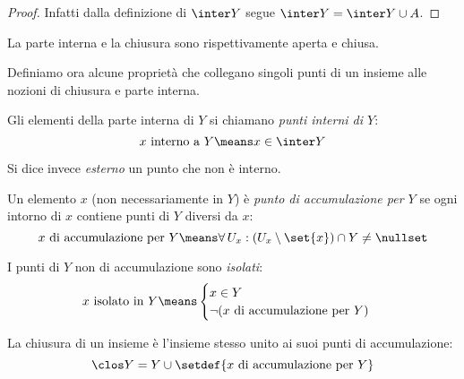 \begin{proof}
	Infatti dalla definizione di $\inter Y$ segue $\inter Y=\inter Y\cup A$.
\end{proof}

\begin{oss}
	La parte interna e la chiusura sono rispettivamente aperta e chiusa.
\end{oss}

Definiamo ora alcune proprietà che collegano singoli punti di un insieme alle nozioni di chiusura e parte interna.

\begin{defn}
	Gli elementi della parte interna di $Y$ si chiamano \emph{punti interni di $Y$}:
	\[x\text{ interno a }Y\means x\in\inter Y\]
\end{defn}

Si dice invece \emph{esterno} un punto che non è interno.


\begin{defn}
	Un elemento $x$ (non necessariamente in $Y$) è \emph{punto di accumulazione per $Y$} se ogni intorno di $x$ contiene punti di $Y$ diversi da $x$:
	\[x\text{ di accumulazione per }Y\means\forall\,U_x:(U_x\setminus\set{x})\cap Y\neq\nullset\]
\end{defn}

\begin{defn}
	I punti di $Y$ non di accumulazione sono \emph{isolati}:
	\[x\text{ isolato in }Y\means
	\begin{cases}
		x\in Y\\
		\neg(x\text{ di accumulazione per }Y)
	\end{cases}\]
\end{defn}

\begin{lemma}
	\label{th:chiusuraacc}
	La chiusura di un insieme è l'insieme stesso unito ai suoi punti di accumulazione:
	\[\clos Y=Y\cup\setdef{x\text{ di accumulazione per }Y}\]
\end{lemma}

